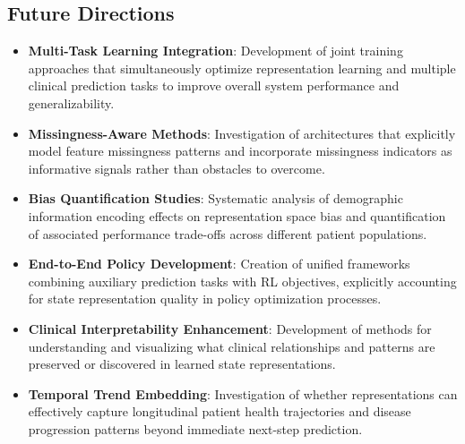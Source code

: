 \subsection*{Future Directions}
\begin{itemize}
    \item \textbf{Multi-Task Learning Integration}: Development of joint training approaches that simultaneously optimize representation learning and multiple clinical prediction tasks to improve overall system performance and generalizability.
    \item \textbf{Missingness-Aware Methods}: Investigation of architectures that explicitly model feature missingness patterns and incorporate missingness indicators as informative signals rather than obstacles to overcome.
    \item \textbf{Bias Quantification Studies}: Systematic analysis of demographic information encoding effects on representation space bias and quantification of associated performance trade-offs across different patient populations.
    \item \textbf{End-to-End Policy Development}: Creation of unified frameworks combining auxiliary prediction tasks with RL objectives, explicitly accounting for state representation quality in policy optimization processes.
    \item \textbf{Clinical Interpretability Enhancement}: Development of methods for understanding and visualizing what clinical relationships and patterns are preserved or discovered in learned state representations.
    \item \textbf{Temporal Trend Embedding}: Investigation of whether representations can effectively capture longitudinal patient health trajectories and disease progression patterns beyond immediate next-step prediction.
\end{itemize}

